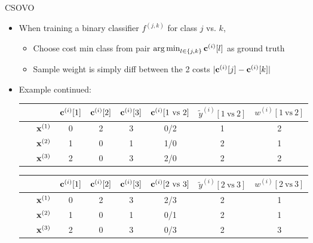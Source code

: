 \documentclass[11pt,compress,t,notes=noshow, xcolor=table]{beamer}
\begin{document}
\begin{vbframe}{CSOVO}
    \begin{itemize}
        \item When training a binary classifier $f^{(j, k)}$ for class $j$ vs. $k$,
        \begin{itemize}
            \item Choose cost min class from pair $\operatorname{arg\,min}_{l \in \{j, k\}} \mathbf{c}^{(i)}[l]$ as ground truth 
            \vspace{5pt}
            
            \item Sample weight is simply diff between the 2 costs      $|\mathbf{c}^{(i)}[j] - \mathbf{c}^{(i)}[k]|$
            \vspace{5pt}

            \vspace{5pt}
        \end{itemize}
        
        \item Example continued:
\begin{center}
    \footnotesize
                            \begin{tabular}{cc|ccc|ccc}\
        			& & $\mathbf{c}^{(i)}[1]$ & $\mathbf{c}^{(i)}[2]$ & $\mathbf{c}^{(i)}[3]$ & $\cv^{(i)}[1 \ \text{vs} \ 2]$ & $\tilde{y}^{( i)}[1 \ \text{vs} \ 2]$ & $w^{(i)}[1 \ \text{vs} \ 2]$\\
        			\hline & $\mathbf{x}^{(1)}$ & 0 & 2 & 3 & 0/2 & 1 & 2\\
        			& $\mathbf{x}^{(2)}$ & 1 & 0 & 1 & 1/0 & 2 & 1 \\
                 	& $\mathbf{x}^{(3)}$ & 2 & 0 & 3 & 2/0 & 2 & 2\\
                \end{tabular}

            \vspace{5pt}
                            \begin{tabular}{cc|ccc|ccc}\
        			& & $\mathbf{c}^{(i)}[1]$ & $\mathbf{c}^{(i)}[2]$ & $\mathbf{c}^{(i)}[3]$ & $\cv^{(i)}[2 \ \text{vs} \ 3]$ & $\tilde{y}^{( i)}[2 \ \text{vs} \ 3]$ & $w^{(i)}[2 \ \text{vs} \ 3]$\\
        			\hline & $\mathbf{x}^{(1)}$ & 0 & 2 & 3 & 2/3 & 2 & 1\\
        			& $\mathbf{x}^{(2)}$ & 1 & 0 & 1 & 0/1 & 2 & 1\\
                 	& $\mathbf{x}^{(3)}$ & 2 & 0 & 3 & 0/3 & 2 & 3\\
                \end{tabular}
\end{center}

    \end{itemize}
\end{vbframe}
\end{document}
